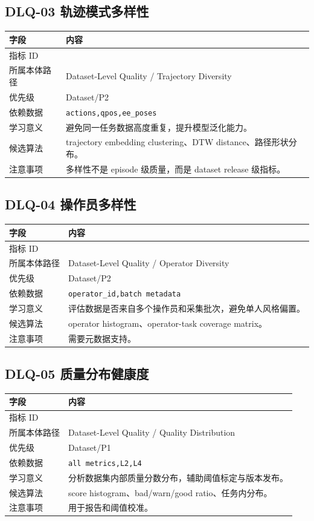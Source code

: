 \documentclass[UTF8,zihao=-4]{ctexart}
\newcommand{\Code}[1]{\texttt{#1}}
\newcommand{\MID}[1]{\texttt{\seqsplit{#1}}}
\begin{document}
\subsection{DLQ-03 轨迹模式多样性}

\begin{longtable}{L{3.6cm} L{9.6cm}}
\toprule
字段 & 内容 \\
\midrule
指标 ID & \MID{DLQ-03} \\
所属本体路径 & Dataset-Level Quality / Trajectory Diversity \\
优先级 & Dataset/P2 \\
依赖数据 & \Code{actions,qpos,ee\_poses} \\
学习意义 & 避免同一任务数据高度重复，提升模型泛化能力。 \\
候选算法 & trajectory embedding clustering、DTW distance、路径形状分布。 \\
注意事项 & 多样性不是 episode 级质量，而是 dataset release 级指标。 \\
\bottomrule
\end{longtable}

\subsection{DLQ-04 操作员多样性}

\begin{longtable}{L{3.6cm} L{9.6cm}}
\toprule
字段 & 内容 \\
\midrule
指标 ID & \MID{DLQ-04} \\
所属本体路径 & Dataset-Level Quality / Operator Diversity \\
优先级 & Dataset/P2 \\
依赖数据 & \Code{operator\_id,batch metadata} \\
学习意义 & 评估数据是否来自多个操作员和采集批次，避免单人风格偏置。 \\
候选算法 & operator histogram、operator-task coverage matrix。 \\
注意事项 & 需要元数据支持。 \\
\bottomrule
\end{longtable}

\subsection{DLQ-05 质量分布健康度}

\begin{longtable}{L{3.6cm} L{9.6cm}}
\toprule
字段 & 内容 \\
\midrule
指标 ID & \MID{DLQ-05} \\
所属本体路径 & Dataset-Level Quality / Quality Distribution \\
优先级 & Dataset/P1 \\
依赖数据 & \Code{all metrics,L2,L4} \\
学习意义 & 分析数据集内部质量分数分布，辅助阈值标定与版本发布。 \\
候选算法 & score histogram、bad/warn/good ratio、任务内分布。 \\
注意事项 & 用于报告和阈值校准。 \\
\bottomrule
\end{longtable}
\end{document}
